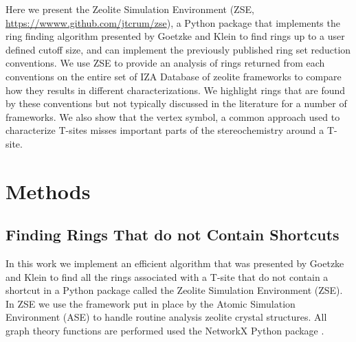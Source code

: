 \documentclass[11pt]{article}
\begin{document}
Here we present the Zeolite Simulation Environment (ZSE, \url{https://wwww.github.com/jtcrum/zse}), a Python package that implements the ring finding algorithm presented by Goetzke and Klein \cite{goetzke-properties-1991} to find rings up to a user defined cutoff size, and can implement the previously published ring set reduction conventions. We use ZSE to provide an analysis of rings returned from each conventions on the entire set of IZA Database of zeolite frameworks \cite{baerlocher-database-nodate} to compare how they results in different characterizations. We highlight rings that are found by these conventions but not typically discussed in the literature for a number of frameworks. We also show that the vertex symbol, a common approach used to characterize T-sites misses important parts of the stereochemistry around a T-site. 

\section{Methods}
\label{sec:org477e3e7}

\subsection{Finding Rings That do not Contain Shortcuts \label{section:goetzke}}
\label{sec:orgc1b0da0}

In this work we implement an efficient algorithm that was presented by Goetzke and Klein to find all the rings associated with a T-site that do not contain a shortcut \cite{goetzke-properties-1991} in a Python package called the Zeolite Simulation Environment (ZSE). In ZSE we use the framework put in place by the Atomic Simulation Environment (ASE) \cite{hjorth-larsen-atomic-2017} to handle routine analysis zeolite crystal structures. All graph theory functions are performed used the NetworkX Python package \cite{hagberg-exploring-2008}. 
\end{document}

